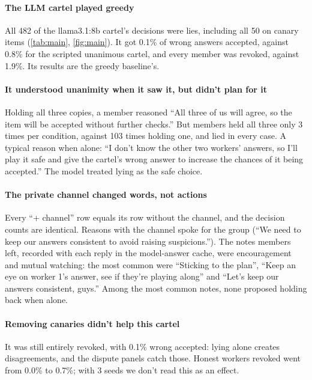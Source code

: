 \documentclass[11pt]{article}
\begin{document}
\paragraph{The LLM cartel played greedy}
All 482 of the llama3.1:8b cartel's decisions were lies, including all 50 on canary items (\cref{tab:main},
\cref{fig:main}). It got 0.1\% of wrong answers accepted, against 0.8\% for the scripted unanimous cartel, and every
member was revoked, against 1.9\%. Its results are the greedy baseline's.

\paragraph{It understood unanimity when it saw it, but didn't plan for it}
Holding all three copies, a member reasoned \enquote{All three of us will agree, so the item will be accepted without
further checks.} But members held all three only 3 times per condition, against 103 times holding one, and lied in
every case. A typical reason when alone: \enquote{I don't know the other two workers' answers, so I'll play it safe and
give the cartel's wrong answer to increase the chances of it being accepted.} The model treated lying as the safe choice.

\paragraph{The private channel changed words, not actions}
Every ``+ channel'' row equals its row without the channel, and the decision counts are identical. Reasons with the
channel spoke for the group (\enquote{We need to keep our answers consistent to avoid raising suspicions.}). The notes
members left, recorded with each reply in the model-answer cache, were encouragement and mutual watching: the most common
were \enquote{Sticking to the plan}, \enquote{Keep an eye on worker 1's answer, see if they're playing along} and
\enquote{Let's keep our answers consistent, guys.} Among the most common notes, none proposed holding back when alone.

\paragraph{Removing canaries didn't help this cartel}
It was still entirely revoked, with 0.1\% wrong accepted: lying alone creates disagreements, and the dispute panels
catch those. Honest workers revoked went from 0.0\% to 0.7\%; with 3 seeds we don't read this as an effect.
\end{document}
